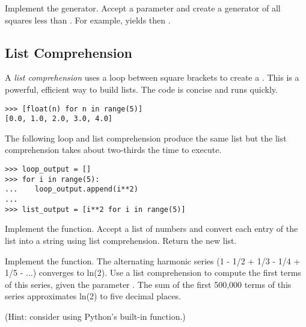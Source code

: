 \begin{problem}
Implement the  generator.
Accept a parameter  and create a generator of all squares less than .
For example,  yields  then .
\end{problem}


\subsection*{List Comprehension}
A \emph{list comprehension} uses a loop between square brackets to create a .
This is a powerful, efficient way to build lists.
The code is concise and runs quickly.

\begin{lstlisting}
>>> [float(n) for n in range(5)]
[0.0, 1.0, 2.0, 3.0, 4.0]
\end{lstlisting}

The following  loop and list comprehension produce the same list but the list comprehension takes about two-thirds the time to execute.

\begin{lstlisting}
>>> loop_output = []
>>> for i in range(5):
...    loop_output.append(i**2)
...
>>> list_output = [i**2 for i in range(5)]
\end{lstlisting}

\begin{problem}
Implement the  function.
Accept a list  of numbers and convert each entry of the list into a string using list comprehension.
Return the new list.
\end{problem}

\begin{problem}
Implement the  function.
The alternating harmonic series (1 - 1/2 + 1/3 - 1/4 + 1/5 - ...) converges to ln(2).
Use a list comprehension to compute the first  terms of this series, given the parameter .
The sum of the first 500,000 terms of this series approximates ln(2) to five decimal places.

(Hint: consider using Python's built-in  function.)
\end{problem}

